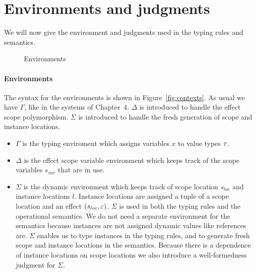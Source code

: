 {\section{Environments and judgments}
\label{sec:contexts}
We will now give the environment and judgments used in the typing rules and semantics.

\begin{figure}[h]
\caption{Environments}
\centering
{}
\end{figure}

\paragraph{Environments}
The syntax for the environments is shown in Figure~\ref{fig:contexts}.
As usual we have $\Gamma$, like in the systems of Chapter~4.
$\Delta$ is introduced to handle the effect scope polymorphism.
$\Sigma$ is introduced to handle the fresh generation of scope and instance locations.

\begin{itemize}
\item $\Gamma$ is the typing enviroment which assigns variables $x$ to value types $\tau$.
\item $\Delta$ is the effect scope variable environment which keeps track of the scope variables $s_{var}$ that are in use.
\item $\Sigma$ is the dynamic environment which keeps track of scope location $s_{loc}$ and instance locations $l$. Instance locations are assigned a tuple of a scope location and an effect $(s_{loc}, \varepsilon)$. $\Sigma$ is used in both the typing rules and the operational semantics.
We do not need a separate environment for the semantics because instances are not assigned dynamic values like references are.
$\Sigma$ enables us to type instances in the typing rules, and to generate fresh scope and instance locations in the semantics.
Because there is a dependence of instance locations on scope locations we also introduce a well-formedness judgment for $\Sigma$.
\end{itemize}

}
